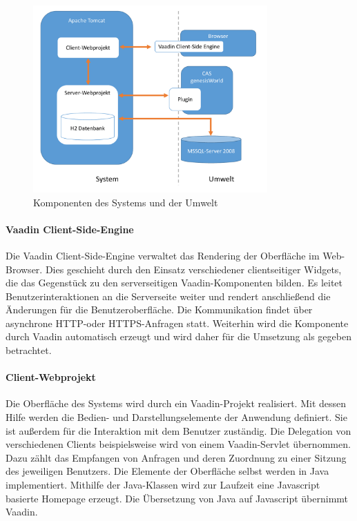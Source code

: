 \begin{figure}[htbp]
\centering
  \includegraphics[width=0.8\textwidth, width=0.8\textwidth]{pics/Konzept_architektur.pdf}
\caption{Komponenten des Systems und der Umwelt}
\label{konzept_architektur}
\end{figure} 

\paragraph{Vaadin Client-Side-Engine}

Die Vaadin Client-Side-Engine verwaltet das Rendering der Oberfläche im Web-Browser.  Dies geschieht durch den Einsatz verschiedener clientseitiger Widgets, die das Gegenstück zu den serverseitigen Vaadin-Komponenten bilden. Es leitet Benutzerinteraktionen an die Serverseite weiter und rendert anschließend die Änderungen für die Benutzeroberfläche. Die Kommunikation findet über asynchrone HTTP-oder HTTPS-Anfragen statt. Weiterhin wird die Komponente durch Vaadin automatisch erzeugt und wird daher für die Umsetzung als gegeben betrachtet.

\paragraph{Client-Webprojekt}

Die Oberfläche des Systems wird durch ein Vaadin-Projekt realisiert. Mit dessen Hilfe werden die Bedien- und Darstellungselemente der Anwendung definiert. Sie ist außerdem für die Interaktion mit dem Benutzer zuständig. Die Delegation von verschiedenen Clients beispielsweise wird von einem Vaadin-Servlet übernommen. Dazu zählt das Empfangen von Anfragen und deren Zuordnung zu einer Sitzung des jeweiligen Benutzers. Die Elemente der Oberfläche selbst werden in Java implementiert. Mithilfe der Java-Klassen wird zur Laufzeit eine Javascript basierte Homepage erzeugt. Die Übersetzung von Java auf Javascript übernimmt Vaadin.

